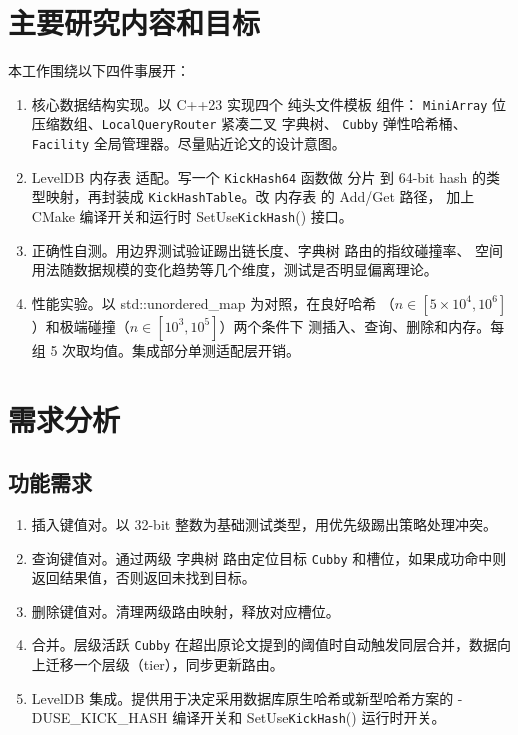 \documentclass[
    type = bachelor,
    fontset = win,
    decl-page = true,
  ]{njuthesis}
\begin{document}
\section{主要研究内容和目标}

本工作围绕以下四件事展开：

\begin{enumerate}
  \item 核心数据结构实现。以 C++23 实现四个 纯头文件模板 组件：
    \texttt{MiniArray} 位压缩数组、\texttt{LocalQueryRouter} 紧凑二叉 字典树、
    \texttt{Cubby} 弹性哈希桶、\texttt{Facility} 全局管理器。尽量贴近论文\cite{1}的设计意图。

  \item LevelDB 内存表 适配。写一个 \texttt{KickHash64} 函数做 分片 到 64-bit
    hash 的类型映射，再封装成 \texttt{KickHashTable}。改 内存表 的 Add/Get 路径，
    加上 CMake 编译开关和运行时 SetUse\texttt{KickHash}() 接口。

  \item 正确性自测。用边界测试验证踢出链长度、字典树 路由的指纹碰撞率、
    空间用法随数据规模的变化趋势等几个维度，测试是否明显偏离理论。

  \item 性能实验。以 std::unordered\_map 为对照，在良好哈希
    （$n\in[5\times10^4,10^6]$）和极端碰撞（$n\in[10^3,10^5]$）两个条件下
    测插入、查询、删除和内存。每组 5 次取均值。集成部分单测适配层开销。
\end{enumerate}

\section{需求分析}

\subsection{功能需求}

\begin{enumerate}[label={FR\arabic*:}]
  \item 插入键值对。以 32-bit 整数为基础测试类型，用优先级踢出策略处理冲突。
  \item 查询键值对。通过两级 字典树 路由定位目标 \texttt{Cubby} 和槽位，如果成功命中则返回结果值，否则返回未找到目标。
  \item 删除键值对。清理两级路由映射，释放对应槽位。
  \item 合并。层级活跃 \texttt{Cubby} 在超出原论文\cite{1}提到的阈值时自动触发同层合并，数据向上迁移一个层级（tier），同步更新路由。
  \item LevelDB 集成。提供用于决定采用数据库原生哈希或新型哈希方案的 -DUSE\_KICK\_HASH 编译开关和 SetUse\texttt{KickHash}() 运行时开关。
\end{enumerate}
\end{document}
